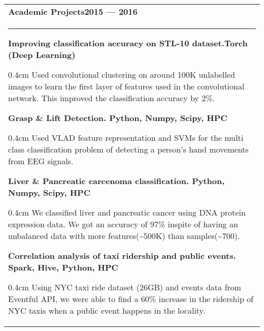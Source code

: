 \documentclass{article}
\newenvironment{projectdescription}{\begin{adjustwidth}{0.4cm}{}}{\end{adjustwidth}}
\begin{document}
\begin{tabular}{p{\dimexpr\linewidth-2\tabcolsep}}
	\bfseries \large{Academic Projects}\hfill 2015 --- 2016 \mdseries \\
	\noindent\rule{\textwidth}{0.4pt}
	\bfseries Improving classification accuracy on STL-10 dataset.\mdseries \hfill Torch (Deep Learning)

	\begin{projectdescription}
	Used convolutional clustering on around 100K unlabelled images to learn the first layer of features used in the convolutional network.  
	This improved the classification accuracy by 2\%.
	\end{projectdescription}
	\smallskip

	\bfseries Grasp \& Lift Detection. \mdseries \hfill Python, Numpy, Scipy, HPC 
	\begin{projectdescription}
	Used VLAD feature representation and SVMs for the multi class classification problem of detecting a person's hand movements from EEG signals.
	\end{projectdescription}
	\smallskip
	\bfseries Liver \& Pancreatic carcenoma classification.  \mdseries\hfill Python, Numpy, Scipy, HPC
	\begin{projectdescription}
		We classified liver and pancreatic cancer using DNA protein expression data.  We got an accuracy of 97\% inspite of having an unbalanced data with more features(\textasciitilde500K) than samples(\textasciitilde700).
	\end{projectdescription}

	\smallskip

	\bfseries Correlation analysis of taxi ridership and public events. \mdseries \hfill Spark, Hive, Python, HPC
	\begin{projectdescription}
			Using NYC taxi ride dataset (26GB) and events data from Eventful API, we were able to find a 60\% increase in the ridership of NYC taxis when a public event happens in the locality.
	\end{projectdescription}
\end{tabular}
\bigskip
\end{document}
